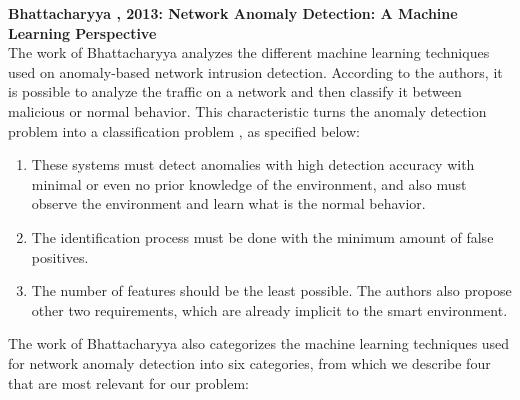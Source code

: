 \textbf{Bhattacharyya \etAl, 2013: Network Anomaly Detection: A Machine Learning Perspective \cite{Bhattacharyya:2013:NAD:2505468}} \\
The work of Bhattacharyya \etAl analyzes the different machine learning techniques used on anomaly-based network intrusion detection. According to the authors, it is possible to analyze the traffic on a network and then classify it between malicious or normal behavior. This characteristic turns the anomaly detection problem into a classification problem \cite{Bhattacharyya:2013:NAD:2505468}, as specified below: \\
\begin{enumerate}
	\item These systems must detect anomalies with high detection accuracy with minimal or even no prior knowledge of the environment, and also must observe the environment and learn what is the normal behavior. 
	\item The identification process must be done with the minimum amount of false positives. 
	\item The number of features should be the least possible. The authors also propose other two requirements, which are already implicit to the smart environment.
\end{enumerate}
The work of Bhattacharyya \etAl also categorizes the machine learning techniques used for network anomaly detection into six categories, from which we describe four that are most relevant for our problem: 

